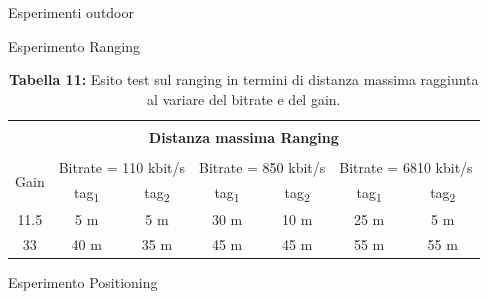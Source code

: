\documentclass[12pt]{report}
\begin{document}
\begin{section}{Esperimenti outdoor}
\begin{subsection}{Esperimento Ranging}
			\begin{table}[H]
					\centering
					\begin{tabular}{|c|c|c|c|c|c|c|}
						\hline
						\multicolumn{7}{|c|}{}\\
						\multicolumn{7}{|c|}{\textbf{\Large Distanza massima Ranging}}\\
						\multicolumn{7}{|c|}{}\\
						\hline
						\multirow{2}{*}{Gain}&							\multicolumn{2}{|c|}{Bitrate = 110 kbit/s}&										\multicolumn{2}{|c|}{Bitrate = 850 kbit/s}&								\multicolumn{2}{|c|}{Bitrate = 6810 kbit/s}\\
						\cline{2-7}
						&																tag\textsubscript{1}&tag\textsubscript{2}&										tag\textsubscript{1}&tag\textsubscript{2}&								tag\textsubscript{1}&tag\textsubscript{2}\\
						\hline
						11.5&														5 m                 &				5 m            &											30 m               &			10 m                  &									25 m                  &			5 m\\
						\hline
						33&															40 m              &				35 m          &													45 m                  &			45 m                  &									55 m                  &			55 m\\
						\hline
					\end{tabular}
					\caption{\textbf{Tabella 11: } Esito test sul ranging in termini di distanza massima raggiunta al variare del bitrate e del gain.\label{EspOutGain}}
			\end{table}
		\end{subsection}

		\begin{subsection}{Esperimento Positioning}


\end{subsection}
\end{section}
\end{document}
